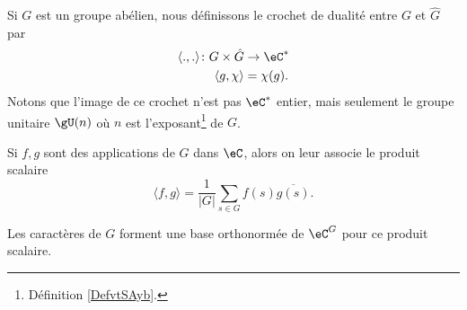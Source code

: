 Si \( G\) est un groupe abélien, nous définissons le crochet de dualité entre \( G\) et \( \hat G\) par
\begin{equation}
    \begin{aligned}
        \langle ., .\rangle \colon G\times \hat G&\to \eC^* \\
        \langle g, \chi\rangle &=\chi(g). 
    \end{aligned}
\end{equation}
Notons que l'image de ce crochet n'est pas \( \eC^*\) entier, mais seulement le groupe unitaire \( \gU(n)\) où \( n\) est l'exposant\footnote{Définition \ref{DefvtSAyb}.} de \( G\).


Si \( f,g\) sont des applications de \( G\) dans \( \eC\), alors on leur associe le produit scalaire
\begin{equation}
    \langle f, g\rangle =\frac{1}{ | G | }\sum_{s\in G}f(s)\overline{ g(s) }.
\end{equation}

\begin{lemma}
    Les caractères de \( G\) forment une base orthonormée de \( \eC^G\) pour ce produit scalaire.    
\end{lemma}

